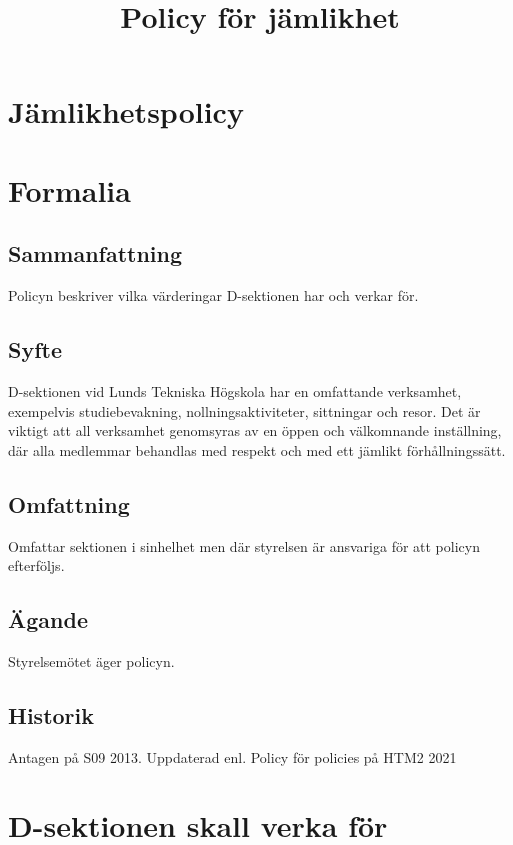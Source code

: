 \documentclass{dsekprotokoll}
\title{Policy för jämlikhet}
\author{}
\begin{document}
\section*{Jämlikhetspolicy}
\section{Formalia}
\subsection{Sammanfattning}
Policyn beskriver vilka värderingar D-sektionen har och verkar för.
\subsection{Syfte}
D-sektionen vid Lunds Tekniska Högskola har en omfattande verksamhet, exempelvis studiebevakning, nollningsaktiviteter, sittningar och resor. Det är viktigt att all verksamhet
genomsyras av en öppen och välkomnande inställning, där alla medlemmar behandlas med
respekt och med ett jämlikt förhållningssätt.
\subsection{Omfattning}
Omfattar sektionen i sinhelhet men där styrelsen är ansvariga för att policyn efterföljs.
\subsection{Ägande}
Styrelsemötet äger policyn.
\subsection{Historik}
Antagen på S09 2013.
Uppdaterad enl. Policy för policies på HTM2 2021


\section{D-sektionen skall verka för}
\end{document}
